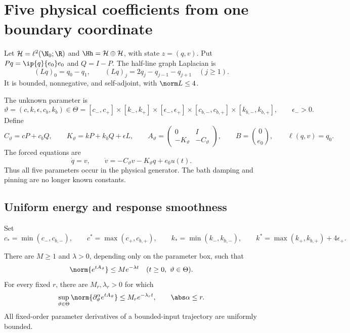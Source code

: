 
\section{Five physical coefficients from one boundary coordinate}
\label{sec:lattice}

Let \(\mathcal H=\ell^2(\N_0;\R)\) and \(\Hh=\mathcal H\oplus\mathcal H\),
with state \(z=(q,v)\).  Put \(Pq=\ip{q}{e_0}e_0\) and \(Q=I-P\).  The
half-line graph Laplacian is
\[
 (Lq)_0=q_0-q_1,
 \qquad
 (Lq)_j=2q_j-q_{j-1}-q_{j+1}\quad(j\ge1).
\]
It is bounded, nonnegative, and self-adjoint, with \(\norm L\le4\).

The unknown parameter is
\[
 \vartheta=(c,k,\epsilon,c_b,k_b)\in
 \Theta=[c_-,c_+]\times[k_-,k_+]\times
 [\epsilon_-,\epsilon_+]\times[c_{b,-},c_{b,+}]
 \times[k_{b,-},k_{b,+}],
 \qquad \epsilon_->0.
\]
Define
\[
 C_\vartheta=cP+c_bQ,\qquad
 K_\vartheta=kP+k_bQ+\epsilon L,\qquad
 A_\vartheta=\begin{pmatrix}0&I\\-K_\vartheta&-C_\vartheta\end{pmatrix},
 \qquad B=\binom0{e_0},\qquad \ell(q,v)=q_0.
\]
The forced equations are
\begin{equation}
 \dot q=v,\qquad
 \dot v=-C_\vartheta v-K_\vartheta q+e_0u(t).
 \label{eq:five-mechanics}
\end{equation}
Thus all five parameters occur in the physical generator.  The bath damping
and pinning are no longer known constants.

\subsection{Uniform energy and response smoothness}

Set
\[
 c_* =\min(c_-,c_{b,-}),\qquad
 c^*=\max(c_+,c_{b,+}),\qquad
 k_* =\min(k_-,k_{b,-}),\qquad
 k^*=\max(k_+,k_{b,+})+4\epsilon_+.
\]

\begin{lemma}
\label{lem:five-energy}
There are \(M\ge1\) and \(\lambda>0\), depending only on the parameter box,
such that
\[
 \norm{e^{tA_\vartheta}}\le Me^{-\lambda t}
 \quad(t\ge0,\ \vartheta\in\Theta).
\]
For every fixed \(r\), there are \(M_r,\lambda_r>0\) for which
\[
 \sup_{\vartheta\in\Theta}
 \norm{\partial_\vartheta^\alpha e^{tA_\vartheta}}
 \le M_re^{-\lambda_rt},
 \qquad \abs\alpha\le r.
\]
All fixed-order parameter derivatives of a bounded-input trajectory are
uniformly bounded.
\end{lemma}

